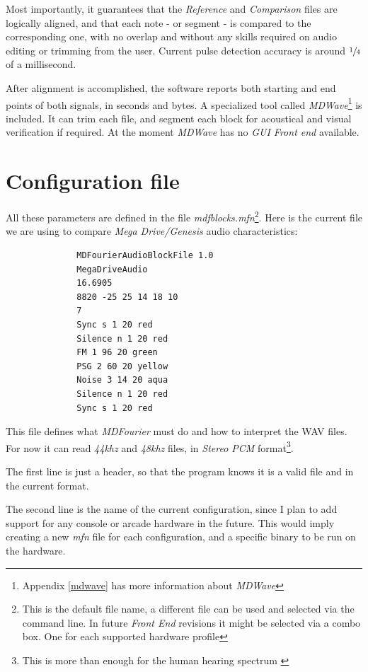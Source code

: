 \documentclass[10pt,a4paper]{report}
\begin{document}
Most importantly, it guarantees that the \textit{Reference} and \textit{Comparison} files are logically aligned, and that each note - or segment - is compared to the corresponding one, with no overlap and without any skills required on audio editing or trimming from the user. Current pulse detection accuracy is around $\sfrac{1}{4}$ of a millisecond.

After alignment is accomplished, the software reports both starting and end points of both signals, in seconds and bytes. A specialized tool called \textit{MDWave}\footnote{Appendix \ref{mdwave} has more  information about \textit{MDWave}} is included. It can trim each file, and segment each block for acoustical and visual verification if required. At the moment \textit{MDWave} has no \textit{GUI Front end} available.  

\section{Configuration file}
\label{mfnconfig}

All these parameters are defined in the file \textit{mdfblocks.mfn}\footnote{This is the default file name, a different file can be used and selected via the command line. In future \textit{Front End} revisions it might be selected via a combo box. One for each supported hardware profile}. Here is the current file we are using to compare \textit{Mega Drive/Genesis} audio characteristics:

\begin{verbatim}
              MDFourierAudioBlockFile 1.0
              MegaDriveAudio
              16.6905
              8820 -25 25 14 18 10
              7
              Sync s 1 20 red
              Silence n 1 20 red
              FM 1 96 20 green
              PSG 2 60 20 yellow
              Noise 3 14 20 aqua
              Silence n 1 20 red
              Sync s 1 20 red
\end{verbatim}

This file defines what \textit{MDFourier} must do and how to interpret the WAV files. For now it can read \textit{44khz} and \textit{48khz} files, in \textit{Stereo PCM} format\footnote{This is more than enough for the human hearing spectrum \cite{MontyMontgomery}}.

The first line is just a header, so that the program knows it is a valid file and in the current format.

The second line is the name of the current configuration, since I plan to add support for any console or arcade hardware in the future. This would imply creating a new \textit{mfn} file for each configuration, and a specific binary to be run on the hardware.
\end{document}
